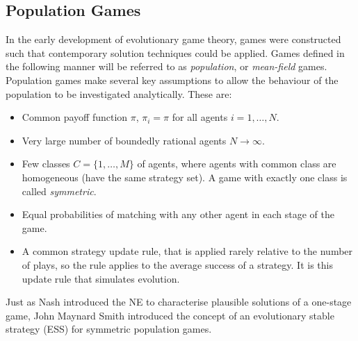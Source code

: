  
\subsection{Population Games}
In the early development of evolutionary game theory, games were constructed such that contemporary solution techniques could be applied. Games defined in the following manner will be referred to as \emph{population}, or \emph{mean-field} games. \\

 Population games make several key assumptions to allow the behaviour of the population to be investigated analytically. These are: \begin{itemize}
    \item Common payoff function $\pi$,  $\pi_i = \pi$ for all agents $i = 1, \dots, N$. 
    \item Very large number of boundedly rational agents $N \to \infty$.
    \item Few classes $C = \{1,\dots, M\}$ of agents, where agents with common class are homogeneous (have the same strategy set). A game with exactly one class is called \emph{symmetric}. 
    \item Equal probabilities of matching with any other agent in each stage of the game. 
    \item A common strategy update rule, that is applied rarely relative to the number of plays, so the rule applies to the average success of a strategy. It is this update rule that simulates evolution.
    
\end{itemize}



Just as Nash introduced the NE to characterise plausible solutions of a one-stage game, John Maynard Smith introduced the concept of an evolutionary stable strategy (ESS) for symmetric population games. 
